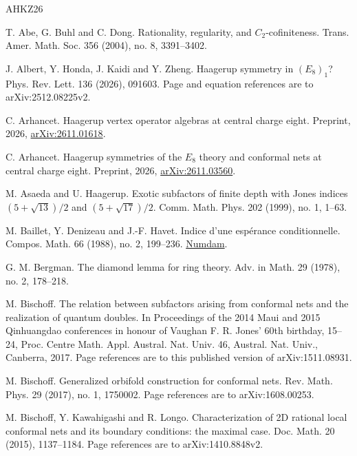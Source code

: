 \documentclass[leqno]{article}
\numberwithin{equation}{section}
\begin{document}
\begin{thebibliography}{AHKZ26}
\raggedright

T. Abe, G. Buhl and C. Dong.
\newblock Rationality, regularity, and $C_2$-cofiniteness.
\newblock Trans. Amer. Math. Soc. 356 (2004), no. 8, 3391--3402.

J. Albert, Y. Honda, J. Kaidi and Y. Zheng.
\newblock Haagerup symmetry in $(E_8)_1$?
\newblock Phys. Rev. Lett. 136 (2026), 091603. Page and equation references are to arXiv:2512.08225v2.

C. Arhancet.
\newblock Haagerup vertex operator algebras at central charge eight.
\newblock Preprint, 2026, \href{https://arxiv.org/abs/2611.01618}{arXiv:2611.01618}.

C. Arhancet.
\newblock Haagerup symmetries of the $E_8$ theory and conformal nets at central charge eight.
\newblock Preprint, 2026, \href{https://arxiv.org/abs/2611.03560}{arXiv:2611.03560}.

M. Asaeda and U. Haagerup.
\newblock Exotic subfactors of finite depth with Jones indices $(5+\sqrt{13})/2$ and $(5+\sqrt{17})/2$.
\newblock Comm. Math. Phys. 202 (1999), no. 1, 1--63.

%
M. Baillet, Y. Denizeau and J.-F. Havet.
\newblock Indice d'une espérance conditionnelle.
\newblock Compos. Math. 66 (1988), no. 2, 199--236. \href{https://www.numdam.org/item/CM_1988__66_2_199_0/}{Numdam}.

G. M. Bergman.
\newblock The diamond lemma for ring theory.
\newblock Adv. in Math. 29 (1978), no. 2, 178--218.

M. Bischoff.
\newblock The relation between subfactors arising from conformal nets and the realization of quantum doubles.
\newblock In Proceedings of the 2014 Maui and 2015 Qinhuangdao conferences in honour of Vaughan F. R. Jones' 60th birthday, 15--24, Proc. Centre Math. Appl. Austral. Nat. Univ. 46, Austral. Nat. Univ., Canberra, 2017. Page references are to this published version of arXiv:1511.08931.

M. Bischoff.
\newblock Generalized orbifold construction for conformal nets.
\newblock Rev. Math. Phys. 29 (2017), no. 1, 1750002. Page references are to arXiv:1608.00253.

M. Bischoff, Y. Kawahigashi and R. Longo.
\newblock Characterization of 2D rational local conformal nets and its boundary conditions: the maximal case.
\newblock Doc. Math. 20 (2015), 1137--1184. Page references are to arXiv:1410.8848v2.


\end{thebibliography}
\end{document}
